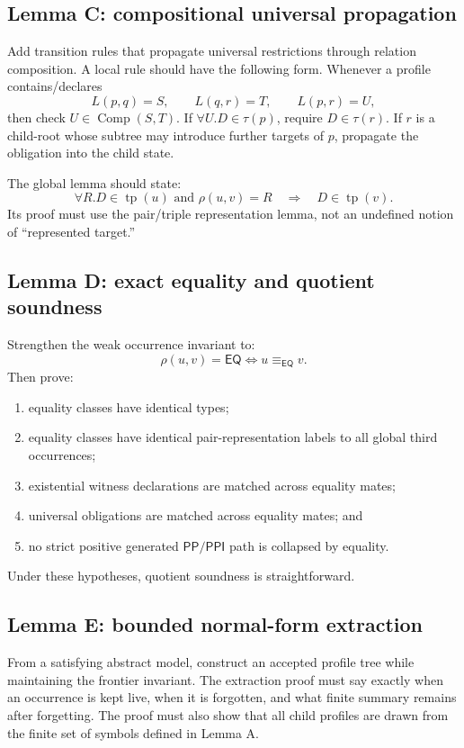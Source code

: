 \documentclass[11pt]{article}
\newcommand{\EQ}{\mathsf{EQ}}
\newcommand{\PP}{\mathsf{PP}}
\newcommand{\PPI}{\mathsf{PPI}}
\newcommand{\Comp}{\operatorname{Comp}}
\newcommand{\tp}{\operatorname{tp}}
\begin{document}
\subsection{Lemma C: compositional universal propagation}

Add transition rules that propagate universal restrictions through relation composition.  A local rule should have the following form.  Whenever a profile contains/declares
\[
  L(p,q)=S,
  \qquad
  L(q,r)=T,
  \qquad
  L(p,r)=U,
\]
then check $U\in\Comp(S,T)$.  If $\forall U.D\in\tau(p)$, require $D\in\tau(r)$.  If $r$ is a child-root whose subtree may introduce further targets of $p$, propagate the obligation into the child state.

The global lemma should state:
\[
  \forall R.D\in\tp(u) \text{ and } \rho(u,v)=R
  \quad\Longrightarrow\quad
  D\in\tp(v).
\]
Its proof must use the pair/triple representation lemma, not an undefined notion of ``represented target.''

\subsection{Lemma D: exact equality and quotient soundness}

Strengthen the weak occurrence invariant to:
\[
  \rho(u,v)=\EQ \iff u\equiv_{\EQ} v.
\]
Then prove:
\begin{enumerate}[label=(D\arabic*)]
\item equality classes have identical types;
\item equality classes have identical pair-representation labels to all global third occurrences;
\item existential witness declarations are matched across equality mates;
\item universal obligations are matched across equality mates; and
\item no strict positive generated $\PP/\PPI$ path is collapsed by equality.
\end{enumerate}
Under these hypotheses, quotient soundness is straightforward.

\subsection{Lemma E: bounded normal-form extraction}

From a satisfying abstract model, construct an accepted profile tree while maintaining the frontier invariant.  The extraction proof must say exactly when an occurrence is kept live, when it is forgotten, and what finite summary remains after forgetting.  The proof must also show that all child profiles are drawn from the finite set of symbols defined in Lemma A.
\end{document}
